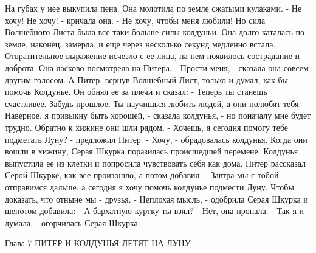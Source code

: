 На губах у нее выкупила пена. Она молотила по земле сжатыми кулаками.
    - Не хочу! Не хочу! - кричала она. - Не хочу, чтобы меня любили!
    Но сила Волшебного Листа была все-таки больше силы колдуньи. Она 
долго каталась по земле, наконец, замерла, и еще через несколько 
секунд медленно встала. Отвратительное выражение исчезло с ее лица, на 
нем появилось сострадание и доброта. Она ласково посмотрела на Питера.
    - Прости меня, - сказала она совсем другим голосом.
    А Питер, вернув Волшебный Лист, только и думал, как бы помочь 
Колдунье. Он обнял ее за плечи и сказал:
    - Теперь ты станешь счастливее. Забудь прошлое. Ты научишься 
любить людей, а они полюбят тебя.
    - Наверное, я привыкну быть хорошей, - сказала колдунья, - но 
поначалу мне будет трудно. Обратно к хижине они шли рядом.
    - Хочешь, я сегодня помогу тебе подметать Луну? - предложил Питер.
    - Хочу, - обрадовалась колдунья.
    Когда они вошли в хижину, Серая Шкурка поразилась происшедшей 
перемене. Колдунья выпустила ее из клетки и попросила чувствовать себя 
как дома.
    Питер рассказал Серой Шкурке, как все произошло, а потом добавил:
    - Завтра мы с тобой отправимся дальше, а сегодня я хочу помочь 
колдунье подмести Луну. Чтобы доказать, что отныне мы - друзья.
    - Неплохая мысль, - одобрила Серая Шкурка и шепотом добавила:
    - А бархатную куртку ты взял?
    - Нет, она пропала.
    - Так я и думала, - огорчилась Серая Шкурка.

        Глава 7
        ПИТЕР И КОЛДУНЬЯ ЛЕТЯТ НА ЛУНУ

